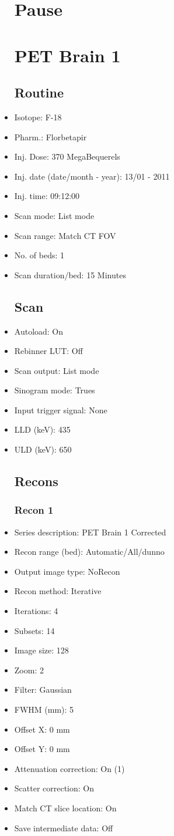 \documentclass[12pt]{article}
\begin{document}
\begin{itemize}
\section{Pause}
\section{PET Brain 1}\subsection{Routine}
\item Isotope: F-18
\item Pharm.: Florbetapir
\item Inj. Dose: 370 MegaBequerels
\item Inj. date (date/month - year): 13/01 - 2011
\item Inj. time: 09:12:00
\item Scan mode: List mode
\item Scan range: Match CT FOV
\item No. of beds: 1
\item Scan duration/bed: 15 Minutes
\subsection{Scan}
\item Autoload: On
\item Rebinner LUT: Off
\item Scan output: List mode
\item Sinogram mode: Trues
\item Input trigger signal: None
\item LLD (keV): 435
\item ULD (keV): 650
\subsection{Recons}
\subsubsection{Recon 1}
\item Series description: PET Brain 1 Corrected
\item Recon range (bed): Automatic/All/dunno
\item Output image type: NoRecon
\item Recon method: Iterative
\item Iterations: 4
\item Subsets: 14
\item Image size: 128
\item Zoom: 2
\item Filter: Gaussian
\item FWHM (mm): 5
\item Offset X: 0 mm
\item Offset Y: 0 mm
\item Attenuation correction: On (1)
\item Scatter correction: On
\item Match CT slice location: On
\item Save intermediate data: Off
\end{itemize}
\end{document}
